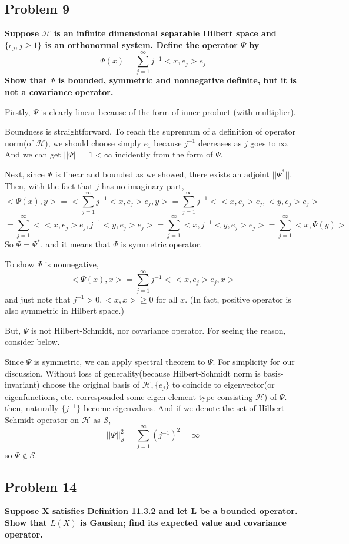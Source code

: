 \documentclass{article}
\begin{document}
\newpage
\subsection{Problem 9}
\textbf{
    Suppose $\mathcal{H}$ is an infinite dimensional separable Hilbert space and $\{e_j,j\geq1\}$ is an orthonormal system.
    Define the operator $\Psi$ by
    \[\Psi(x)=\sum_{j=1}^{\infty}j^{-1}<x,e_j>e_j\]
    Show that $\Psi$ is bounded, symmetric and nonnegative definite, but it is not a covariance operator.
}

Firstly, $\Psi$ is clearly linear because of the form of inner product (with multiplier).

Boundness is straightforward. To reach the supremum of a definition of operator norm(of $\mathcal{H}$),
we should choose simply $e_1$ because $j^{-1}$ decreases as $j$ goes to $\infty$.
And we can get $||\Psi||=1<\infty$ incidently from the form of $\Psi$.

Next, since $\Psi$ is linear and bounded as we showed, there exists an adjoint $||\Psi^*||$.
Then, with the fact that $j$ has no imaginary part,
\[<\Psi(x),y>=<\sum_{j=1}^{\infty}j^{-1}<x,e_j>e_j,y>
=\sum_{j=1}^{\infty}j^{-1}<<x,e_j>e_j,<y,e_j>e_j>\]
\[=\sum_{j=1}^{\infty}<<x,e_j>e_j,j^{-1}<y,e_j>e_j>
=\sum_{j=1}^{\infty}<x,j^{-1}<y,e_j>e_j>
=\sum_{j=1}^{\infty}<x,\Psi(y)>\]
So $\Psi=\Psi^*$, and it means that $\Psi$ is symmetric operator.

To show $\Psi$ is nonnegative,
\[<\Psi(x),x>=\sum_{j=1}^{\infty}j^{-1}<<x,e_j>e_j,x>\]
and just note that $j^{-1}>0, <x,x>\geq0$ for all $x$. (In fact, positive operator is also symmetric in Hilbert space.)

But, $\Psi$ is not Hilbert-Schmidt, nor covariance operator. For seeing the reason, consider below.

Since $\Psi$ is symmetric, we can apply spectral theorem to $\Psi$.
For simplicity for our discussion, Without loss of generality(because Hilbert-Schmidt norm is basis-invariant) 
choose the original basis of $\mathcal{H}, \{e_j\}$ to coincide to eigenvector(or eigenfunctions, etc. corresponded some eigen-element type consisting $\mathcal{H}$) of $\Psi$.
then, naturally $\{j^{-1}\}$ become eigenvalues. And if we denote the set of Hilbert-Schmidt operator on $\mathcal{H}$ as $\mathcal{S}$,
\[||\Psi||_{\mathcal{S}}^{2}=\sum_{j=1}^{\infty}(j^{-1})^2=\infty\]
so $\Psi\notin\mathcal{S}$.



\subsection{Problem 14}
\textbf{
    Suppose X satisfies Definition 11.3.2 and let L be a bounded operator. 
    Show that $L(X)$ is Gausian; find its expected value and covariance operator.
}
\end{document}
